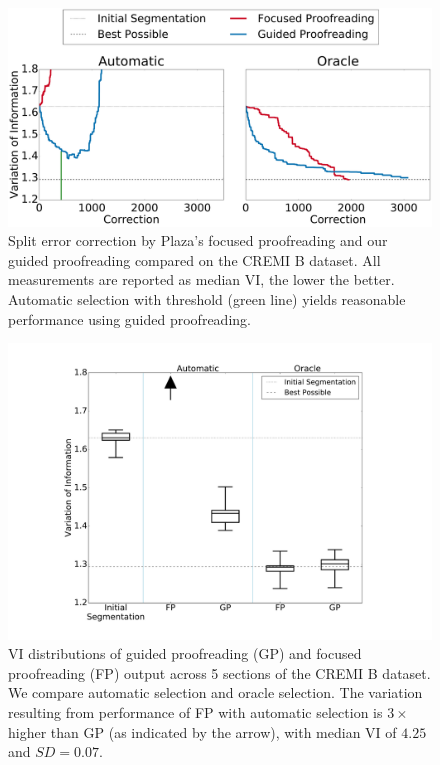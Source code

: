 \begin{figure}[t]
\centering
\includegraphics[width=\linewidth]{gfx/cremiB_trails.pdf}
\caption{Split error correction by Plaza's focused proofreading and our guided proofreading compared on the CREMI B dataset. All measurements are reported as median VI, the lower the better. Automatic selection with threshold (green line) yields reasonable performance using guided proofreading.}
\label{fig:cremiBtrails}
\end{figure}

\begin{figure}[t]
\centering
\includegraphics[width=\linewidth]{gfx/cremiBboxplot.pdf}
\caption{VI distributions of guided proofreading (GP) and focused proofreading (FP) output across 5 sections of the CREMI B dataset. We compare automatic selection and oracle selection. The variation resulting from performance of FP with automatic selection is $3\times$ higher than GP (as indicated by the arrow), with median VI of $4.25$ and $SD=0.07$.}
\label{fig:cremiBboxplot}
\end{figure}

